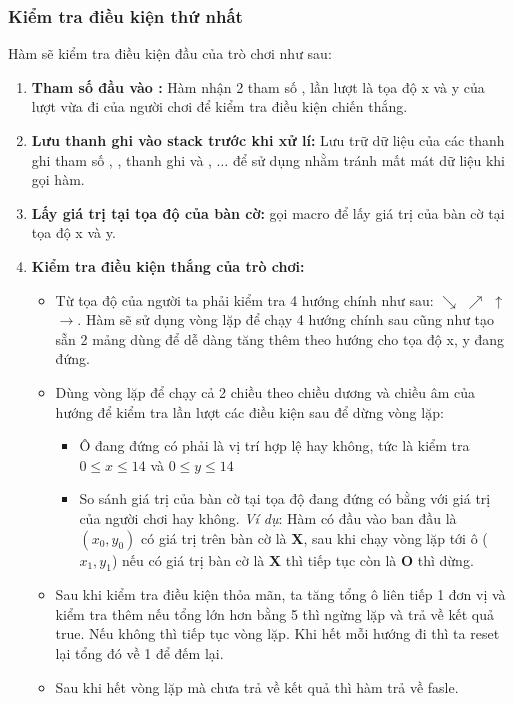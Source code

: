 \subsubsection{Kiểm tra điều kiện thứ nhất}
Hàm  sẽ kiểm tra điều kiện đầu của trò chơi như sau:
\begin{enumerate}
\item \textbf{Tham số đầu vào :} Hàm nhận 2 tham số ,  lần lượt là tọa độ x và y của lượt vừa đi của người chơi để kiểm tra điều kiện chiến thắng.  
\item \textbf{Lưu thanh ghi vào stack trước khi xử lí:} Lưu trữ dữ liệu của các thanh ghi tham số , , thanh ghi  và , \(\dots\) để sử dụng nhằm tránh mất mát dữ liệu khi gọi hàm.
\item \textbf{Lấy giá trị tại tọa độ của bàn cờ:} gọi macro  để lấy giá trị của bàn cờ tại tọa độ x và y.
\item \textbf{Kiểm tra điều kiện thắng của trò chơi:} 
    \begin{itemize}
        \item Từ tọa độ của người ta phải kiểm tra 4 hướng chính như sau: \(\searrow \) \(\nearrow\) \(\uparrow\) \(\to \). Hàm sẽ sử dụng vòng lặp để chạy 4 hướng chính sau cũng như tạo sẵn 2 mảng dùng để dễ dàng tăng thêm theo hướng cho tọa độ x, y đang đứng. 
        \item Dùng vòng lặp để chạy cả 2 chiều theo chiều dương và chiều âm của hướng để kiểm tra lần lượt các điều kiện sau để dừng vòng lặp:
        \begin{itemize}
            \item Ô đang đứng có phải là vị trí hợp lệ hay không, tức là kiểm tra \(0 \leq x \leq 14\) và \(0 \leq y \leq 14\)
            \item So sánh giá trị của bàn cờ tại tọa độ đang đứng có bằng với giá trị của người chơi hay không. \textit{Ví dụ}: Hàm có đầu vào ban đầu là \((x_0, y_0)\) có giá trị trên bàn cờ là \textbf{X}, sau khi chạy vòng lặp tới ô (\(x_1, y_1\)) nếu có giá trị bàn cờ là \textbf{X} thì tiếp tục còn là \textbf{O} thì dừng.
        \end{itemize}
        \item Sau khi kiểm tra điều kiện thỏa mãn, ta tăng tổng ô liên tiếp 1 đơn vị và kiểm tra thêm nếu tổng lớn hơn bằng 5 thì ngừng lặp và trả về kết quả true. Nếu không thì tiếp tục vòng lặp. Khi hết mỗi hướng đi thì ta reset lại tổng đó về 1 để đếm lại.
        \item Sau khi hết vòng lặp mà chưa trả về kết quả thì hàm trả về fasle. 

\end{itemize}
\end{enumerate}
